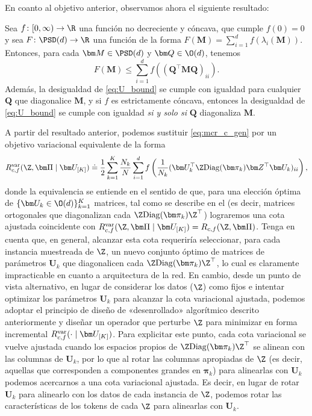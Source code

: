 \documentclass[../../book-main.tex]{subfiles}
\begin{document}
En coanto al objetivo anterior, observamos ahora el siguiente resultado:
\begin{theorem}
    \label{thm:var_concave}
    Sea \(f \colon [0, \infty) \to \R\) una función no decreciente y cóncava,
    que cumple \(f(0) = 0\) y sea \(F \colon \PSD(d) \to \R\) una función
    de la forma \(F(\bm M) = \sum_{i = 1}^{d}f(\lambda_{i}(\bm M))\).
    Entonces, para cada \(\bm M \in \PSD(d)\) y \(\bm Q \in \O(d)\), tenemos
    \begin{equation}
        \label{eq:U_bound}
        F(\bm M) \leq  \sum_{i=1}^{d} f\left( (\bm Q^{\top} \bm M \bm
        Q)_{ii} \right).
    \end{equation}
    Además, la desigualdad de \eqref{eq:U_bound} se cumple con
    igualdad para cualquier $\bm Q$ que diagonalice $\bm M$, y si $f$
    es estrictamente cóncava, entonces la desigualdad de \eqref{eq:U_bound} se
    cumple con igualdad \textit{si y solo si} $\bm Q$ diagonaliza $\bm M$.
\end{theorem}

A partir del resultado anterior, podemos sustituir \eqref{eq:mcr_c_gen} por un
objetivo variacional equivalente de la forma
\begin{equation}
    \label{eq:var_comp}
    R^{\rm var}_{c,f} (\Z,\bm \Pi \mid \bm U_{[K]}) \doteq
    \frac{1}{2}\sum_{k=1}^K \frac{N_k}{N} \sum_{i=1}^{d}
    f\left(\frac{1}{N_k} (\bm U_{k}^{\top} \Z \mathrm{Diag}(\bm
    \pi_k) \bm Z^{\top} \bm U_{k})_{ii} \right),
\end{equation}
donde la equivalencia se entiende en el sentido de que, para una elección óptima de
$\{ \bm U_k \in \O(d)\}_{k=1}^K$ matrices, tal como se describe en el
 (es decir, matrices ortogonales que diagonalizan
cada $\Z \mathrm{Diag}(\bm \pi_k) \Z^\top $) lograremos una cota ajustada
coincidente con $ R^{\rm var}_{c,f} (\Z,\bm \Pi \mid \bm U_{[K]}) =
R_{c,f} (\Z,\bm \Pi)$. Tenga en cuenta que, en general, alcanzar esta cota
requeriría seleccionar, para cada instancia muestreada de $\Z$, un nuevo
conjunto óptimo de matrices de parámetros $\bm U_{k}$ que diagonalicen cada
$\Z\mathrm{Diag}(\bm \pi_{k})\Z^{\top}$, lo cual es claramente impracticable
en cuanto a arquitectura de la red.
En cambio, desde un punto de vista alternativo, en lugar de considerar los
datos ($\Z$) como fijos e intentar optimizar los parámetros $\bm U_k$
para alcanzar la cota variacional ajustada, podemos adoptar el
principio de diseño de «desenrollado» algorítmico descrito anteriormente y diseñar un
operador que perturbe $\Z$ para minimizar en forma incremental $R_{c, f}^{\rm
var}(\cdot \mid \bm U_{[K]})$. Para explicitar este punto, cada
cota variacional se vuelve ajustada cuando los espacios propios de $\Z
\mathrm{Diag}(\bm \pi_k) \Z
^\top$ se alinean con las columnas de $\bm U_k$, por lo que al rotar las
columnas apropiadas de $\Z$ (es decir, aquellas que corresponden a componentes grandes
en $\bm \pi_k$) para alinearlas con $\bm U_k$ podemos acercarnos a una
cota variacional ajustada. Es decir, en lugar de rotar $\bm U_k$ para
alinearlo con los datos de cada instancia de $\Z$, podemos rotar
las características de los tokens de cada $\Z$ para alinearlas con $\bm U_k$.
\end{document}
